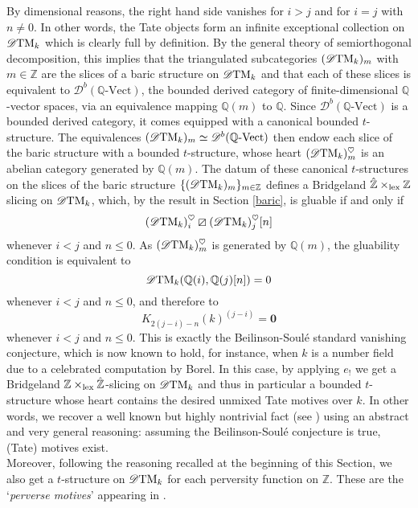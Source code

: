 \documentclass{article}
\theoremstyle{definition}
\newcommand{\Z}{\mathbb{Z}}
\newcommand{\orth}{\boxslash}
\newcommand{\lex}{\times_{\textnormal{lex}}}
\begin{document}
  By dimensional reasons, the right hand side vanishes for $i > j$ and for $i = j$ with $n \neq 0$. In other words, the Tate objects form an infinite exceptional collection on $\mathscr{D}\textnormal{TM}_k$ which is clearly full by definition. By the general theory of semiorthogonal decomposition, this implies that the triangulated subcategories $(\mathscr{D}\textnormal{TM}_k)_{m}$ with $m\in \Z$ are the slices of a baric structure on $\mathscr{D}\textnormal{TM}_k$ and that each of these slices is equivalent to $\mathscr{D}^b(\mathbb{Q}\text{-Vect})$,
 the bounded derived category  of finite-dimensional $\mathbb{Q}$-vector spaces, via an equivalence mapping $\mathbb{Q}(m)$ to $\mathbb{Q}$. %
   Since $\mathscr{D}^b(\mathbb{Q}\text{-Vect})$ is a bounded derived category, it comes equipped with a canonical bounded $t$-structure. The equivalences $(\mathscr{D}\textnormal{TM}_k)_{m}\simeq \mathscr{D}^b(\mathbb{Q}\text{-Vect})$ then endow each slice of the baric structure with a bounded $t$-structure, whose heart $(\mathscr{D}\textnormal{TM}_k)_{m}^\heartsuit$ is an abelian category generated by $\mathbb{Q}(m)$. The datum of these canonical $t$-structures on the slices of the baric structure  $\{(\mathscr{D}\textnormal{TM}_k)_{m}\}_{m\in \mathbb{Z}}$ defines a Bridgeland $\hat{\Z}\lex \Z$ slicing on $\mathscr{D}\textnormal{TM}_k$, which, by the result in Section \ref{baric}, is gluable if and only if  
\[
(\mathscr{D}\textnormal{TM}_k)_{i}^\heartsuit\orth(\mathscr{D}\textnormal{TM}_k)_{j}^\heartsuit[n]
\]
 whenever $i<j$ and $n\leq 0$. As $(\mathscr{D}\textnormal{TM}_k)_{m}^\heartsuit$ is generated by $\mathbb{Q}(m)$, the gluability condition is equivalent to
 \[
   \mathscr{D}\textnormal{TM}_k(\mathbb{Q}(i),\mathbb{Q}(j)[n])=0
    \]
 whenever $i<j$ and $n\leq 0$, and therefore to    
\[
K_{2(j-i)-n}(k)^{(j-i)} = \mathbf{0}
\]  whenever  $i < j$ and $n \leq 0$. This is exactly the Beilinson-Soul\'e standard vanishing conjecture, which is now known to hold, for instance, when $k$ is a number field due to a celebrated computation by Borel. In this case, by applying $e_!$ we get a Bridgeland $\Z \lex \hat{\Z}$-slicing on $\mathscr{D}\textnormal{TM}_k$ and thus in particular a bounded $t$-structure whose heart contains the desired unmixed Tate motives over $k$. In other words, we recover a well known but highly nontrivial fact (see \cite{levine}) using an abstract and very general reasoning: assuming the Beilinson-Soul\'e conjecture is true, (Tate) motives exist. \\
   Moreover, following the reasoning recalled at the beginning of this Section, we also get a $t$-structure on $\mathscr{D}\textnormal{TM}_k$ for each perversity function on $\mathbb{Z}$. These are the `\textit{perverse motives}' appearing in \cite{permot}. 
\end{document}
